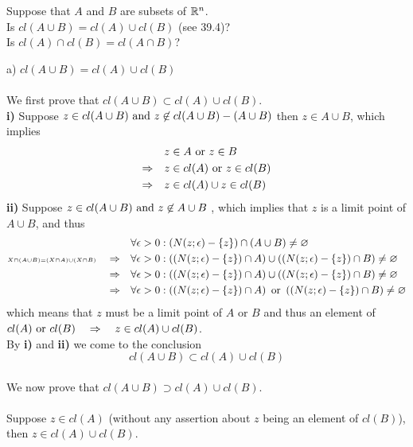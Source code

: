 \begin{tcolorbox}
Suppose that $A$ and $B$ are subsets of $\mathbb{R}^n$.\\ Is $cl(A \cup B)= cl(A)\cup cl(B)$ (see 39.4)?\\ Is $cl(A)\cap cl(B)=cl(A \cap B)$?
\end{tcolorbox}
a) $cl(A \cup B)= cl(A)\cup cl(B)$\\\\
We first prove that $cl(A \cup B)\subset cl(A)\cup cl(B)$.\\
\textbf{i)} Suppose $z\in cl(A\cup B) \text{ and } z\not \in cl(A\cup B)- (A\cup B)$ then $z\in A\cup B$,  which implies 
\begin{align*}
&z\in  A\text{ or } z\in B\\
\Rightarrow \quad & z\in  cl(A)\text{ or } z\in cl(B)\\
\Rightarrow \quad & z\in  cl(A)\cup  z\in cl(B)
\end{align*}
\textbf{ii)} Suppose $z\in cl(A\cup B) \text{ and } z\not \in A\cup B$ ,  which implies that $z$ is a limit point of $A\cup B$, and thus 
\begin{align*}
&\forall\epsilon>0: \left(N(z;\epsilon)-\{z\}\right)\cap \left(A\cup B\right)\neq\varnothing\\
\scriptscriptstyle X\cap\left(A\cup B\right) = \left(X\cap A\right)\cup \left(X\cap B\right)\quad \displaystyle\Rightarrow\quad &\forall\epsilon>0: \left(\left(N(z;\epsilon)-\{z\}\right)\cap A\right)\cup\left(\left(N(z;\epsilon)-\{z\}\right)\cap B\right)\neq\varnothing\\
\Rightarrow\quad &\forall\epsilon>0: \left(\left(N(z;\epsilon)-\{z\}\right)\cap A\right)\cup\left(\left(N(z;\epsilon)-\{z\}\right)\cap B\right)\neq\varnothing\\
\Rightarrow\quad &\forall\epsilon>0: \left(\left(N(z;\epsilon)-\{z\}\right)\cap A\right)\text{ or } \left(\left(N(z;\epsilon)-\{z\}\right)\cap B\right)\neq\varnothing
\end{align*}
which means that $z$ must be a limit point of $A$ or $B$ and thus an element of $cl(A)\text{ or } cl(B)\quad\Rightarrow\quad z\in cl(A)\cup cl(B)$.\\
By \textbf{i)} and \textbf{ii)} we come to the conclusion
$$ cl(A \cup B)\subset cl(A)\cup cl(B)$$\\
We now prove that $cl(A \cup B)\supset cl(A)\cup cl(B)$.\\\\
Suppose $z\in cl(A)$ (without any assertion about $z$ being an element of  $cl(B)$), then $z\in cl(A)\cup cl(B)$.\\
